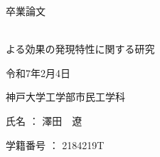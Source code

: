 \thispagestyle{empty}
\pagestyle{empty}
\begin{center}
\Huge{卒業論文}

\vspace*{1.5cm}

\Huge{ \\よる効果の発現特性に関する研究}\\

\vspace*{5.5cm} %


\huge{令和\textsf{7}年\textsf{2}月\textsf{4}日}


\vspace*{0.5cm}

\huge{神戸大学工学部市民工学科}

\vspace*{1cm}

\huge{氏名 ： 澤田　遼}

\vspace*{0.5cm}

\huge{学籍番号 ： \textsf{2184219T}}


\end{center}